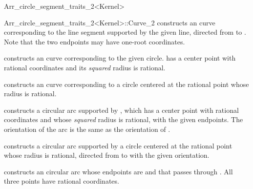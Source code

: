 \begin{ccRefClass}{Arr_circle_segment_traits_2<Kernel>}
\begin{ccClass}{Arr_circle_segment_traits_2<Kernel>::Curve_2}
    {constructs an curve corresponding to the line segment supported by
     the given line, directed from  to .
     Note that the two endpoints may have one-root coordinates.
     }

    {constructs an curve corresponding to the given circle. 
     has a center point with rational coordinates and its {\em squared}
     radius is rational.}

    {constructs an curve corresponding to a circle centered at the rational
     point  whose radius  is rational.}

    {constructs a circular arc supported by , which has a
     center point with rational coordinates and whose {\em squared}
     radius is rational, with the given endpoints. The orientation of the
     arc is the same as the orientation of .
     }

    {constructs a circular arc supported by a circle centered at the rational
     point  whose radius  is rational, directed from
      to  with the given orientation.
     }

    {constructs an circular arc whose endpoints are  and
      that passes through . All three points have
     rational coordinates.
     }


\end{ccClass}
\end{ccRefClass}
